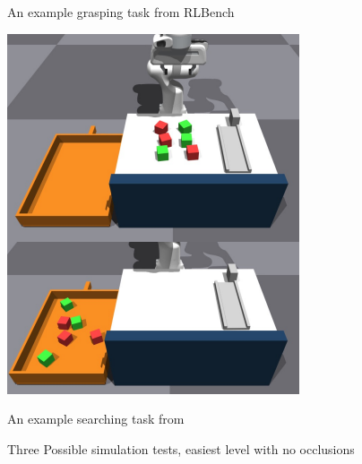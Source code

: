 \begin{figure}[h]
\begin{minipage}{0.32\textwidth}
      \caption{An example grasping task from RLBench \cite{james2019rlbenchrobotlearningbenchmark}}
  \end{minipage}
  \hfill
  \begin{minipage}{0.32\textwidth}
      \centering
      \includegraphics[width=\textwidth]{assets/eval-plan/search-sim.png}
      \caption{An example searching task from \cite{liang2022searchbasedtaskplanninglearned}}
  \end{minipage}
  \caption{Three Possible simulation tests, easiest level with no occlusions}\label{fig:threesims}
\end{figure}
